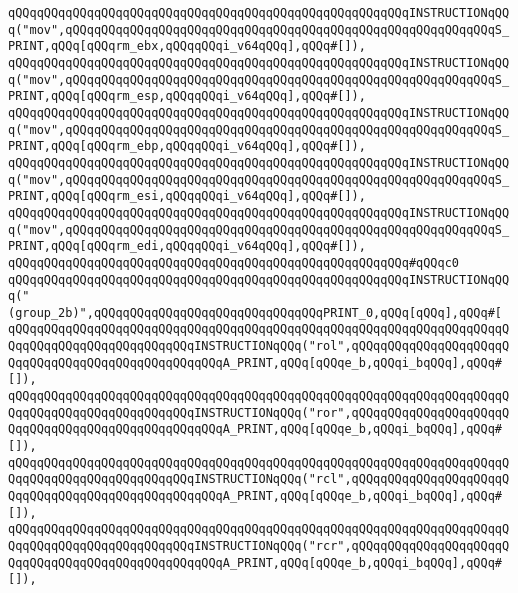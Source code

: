 \verb|qQQqqQQqqQQqqQQqqQQqqQQqqQQqqQQqqQQqqQQqqQQqqQQqqQQqqQQqINSTRUCTIONqQQq("mov",qQQqqQQqqQQqqQQqqQQqqQQqqQQqqQQqqQQqqQQqqQQqqQQqqQQqqQQqqQQqS_PRINT,qQQq[qQQqrm_ebx,qQQqqQQqi_v64qQQq],qQQq#[]),|\newline
\verb|qQQqqQQqqQQqqQQqqQQqqQQqqQQqqQQqqQQqqQQqqQQqqQQqqQQqqQQqINSTRUCTIONqQQq("mov",qQQqqQQqqQQqqQQqqQQqqQQqqQQqqQQqqQQqqQQqqQQqqQQqqQQqqQQqqQQqS_PRINT,qQQq[qQQqrm_esp,qQQqqQQqi_v64qQQq],qQQq#[]),|\newline
\verb|qQQqqQQqqQQqqQQqqQQqqQQqqQQqqQQqqQQqqQQqqQQqqQQqqQQqqQQqINSTRUCTIONqQQq("mov",qQQqqQQqqQQqqQQqqQQqqQQqqQQqqQQqqQQqqQQqqQQqqQQqqQQqqQQqqQQqS_PRINT,qQQq[qQQqrm_ebp,qQQqqQQqi_v64qQQq],qQQq#[]),|\newline
\verb|qQQqqQQqqQQqqQQqqQQqqQQqqQQqqQQqqQQqqQQqqQQqqQQqqQQqqQQqINSTRUCTIONqQQq("mov",qQQqqQQqqQQqqQQqqQQqqQQqqQQqqQQqqQQqqQQqqQQqqQQqqQQqqQQqqQQqS_PRINT,qQQq[qQQqrm_esi,qQQqqQQqi_v64qQQq],qQQq#[]),|\newline
\verb|qQQqqQQqqQQqqQQqqQQqqQQqqQQqqQQqqQQqqQQqqQQqqQQqqQQqqQQqINSTRUCTIONqQQq("mov",qQQqqQQqqQQqqQQqqQQqqQQqqQQqqQQqqQQqqQQqqQQqqQQqqQQqqQQqqQQqS_PRINT,qQQq[qQQqrm_edi,qQQqqQQqi_v64qQQq],qQQq#[]),|\newline
\verb|qQQqqQQqqQQqqQQqqQQqqQQqqQQqqQQqqQQqqQQqqQQqqQQqqQQqqQQq#qQQqc0|\newline
\verb|qQQqqQQqqQQqqQQqqQQqqQQqqQQqqQQqqQQqqQQqqQQqqQQqqQQqqQQqINSTRUCTIONqQQq("(group_2b)",qQQqqQQqqQQqqQQqqQQqqQQqqQQqqQQqPRINT_0,qQQq[qQQq],qQQq#[|\newline
\verb|qQQqqQQqqQQqqQQqqQQqqQQqqQQqqQQqqQQqqQQqqQQqqQQqqQQqqQQqqQQqqQQqqQQqqQQqqQQqqQQqqQQqqQQqqQQqqQQqINSTRUCTIONqQQq("rol",qQQqqQQqqQQqqQQqqQQqqQQqqQQqqQQqqQQqqQQqqQQqqQQqqQQqA_PRINT,qQQq[qQQqe_b,qQQqi_bqQQq],qQQq#[]),|\newline
\verb|qQQqqQQqqQQqqQQqqQQqqQQqqQQqqQQqqQQqqQQqqQQqqQQqqQQqqQQqqQQqqQQqqQQqqQQqqQQqqQQqqQQqqQQqqQQqqQQqINSTRUCTIONqQQq("ror",qQQqqQQqqQQqqQQqqQQqqQQqqQQqqQQqqQQqqQQqqQQqqQQqqQQqA_PRINT,qQQq[qQQqe_b,qQQqi_bqQQq],qQQq#[]),|\newline
\verb|qQQqqQQqqQQqqQQqqQQqqQQqqQQqqQQqqQQqqQQqqQQqqQQqqQQqqQQqqQQqqQQqqQQqqQQqqQQqqQQqqQQqqQQqqQQqqQQqINSTRUCTIONqQQq("rcl",qQQqqQQqqQQqqQQqqQQqqQQqqQQqqQQqqQQqqQQqqQQqqQQqqQQqA_PRINT,qQQq[qQQqe_b,qQQqi_bqQQq],qQQq#[]),|\newline
\verb|qQQqqQQqqQQqqQQqqQQqqQQqqQQqqQQqqQQqqQQqqQQqqQQqqQQqqQQqqQQqqQQqqQQqqQQqqQQqqQQqqQQqqQQqqQQqqQQqINSTRUCTIONqQQq("rcr",qQQqqQQqqQQqqQQqqQQqqQQqqQQqqQQqqQQqqQQqqQQqqQQqqQQqA_PRINT,qQQq[qQQqe_b,qQQqi_bqQQq],qQQq#[]),|\newline
